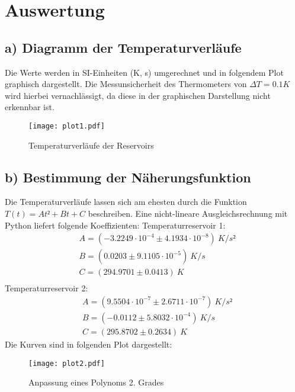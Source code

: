 
\section{Auswertung}
\label{sec:Auswertung}

\subsection{a) Diagramm der Temperaturverläufe}
Die Werte werden in SI-Einheiten (K, s) umgerechnet und in folgendem Plot graphisch dargestellt.
Die Messunsicherheit des Thermometers von $\Delta T = 0.1 K$ wird hierbei vernachlässigt, 
da diese in der graphischen Darstellung nicht erkennbar ist.
\begin{figure}
  \centering
  \texttt{[image: plot1.pdf]}
  \caption{Temperaturverläufe  der Reservoirs}
  \label{fig:temp}
\end{figure}

\subsection{b) Bestimmung der Näherungsfunktion}
Die Temperaturverläufe lassen sich am ehesten durch die Funktion $T(t)=At²+Bt+C$ 
beschreiben. Eine nicht-lineare Ausgleichsrechnung mit Python liefert folgende Koeffizienten:\newline
Temperaturreservoir 1:
\begin{align*}
& A = (-3.2249\cdot 10^{-4} \pm 4.1934\cdot 10^{-8})\ K/s²\\
& B = (0.0203 \pm 9.1105 \cdot 10^{-5} )\ K/s\\
& C = (294.9701\pm 0.0413)\ K\\
\end{align*} 
Temperaturreservoir 2:
\begin{align*}
& A = (9.5504\cdot 10^{-7} \pm 2.6711 \cdot 10^{-7})\ K/s²\\
& B = (-0.0112\pm 5.8032 \cdot 10^{-4})\ K/s\\
& C = (295.8702\pm 0.2634)\ K
\end{align*} 
Die Kurven sind in folgenden Plot dargestellt:
\begin{figure}
  \centering
  \texttt{[image: plot2.pdf]}
  \caption{Anpassung eines Polynoms 2. Grades}
  \label{fig:temp}
\end{figure}

